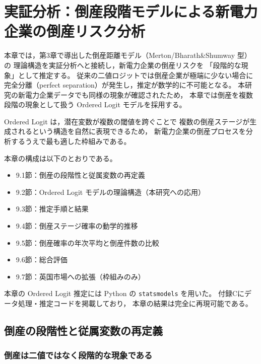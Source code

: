 
\chapter{実証分析：倒産段階モデルによる新電力企業の倒産リスク分析}
\label{chap:empirical}

本章では，第3章で導出した倒産距離モデル（Merton/Bharath\&Shumway 型）の
理論構造を実証分析へと接続し，新電力企業の倒産リスクを
「段階的な現象」として推定する。
従来の二値ロジットでは倒産企業が極端に少ない場合に
完全分離（perfect separation）が発生し，推定が数学的に不可能となる。
本研究の新電力企業データでも同様の現象が確認されたため，
本章では倒産を複数段階の現象として扱う Ordered Logit モデルを採用する。

Ordered Logit は，潜在変数が複数の閾値を跨ぐことで
複数の倒産ステージが生成されるという構造を自然に表現できるため，
新電力企業の倒産プロセスを分析するうえで最も適した枠組みである。

本章の構成は以下のとおりである。

\begin{itemize}
    \item 9.1節：倒産の段階性と従属変数の再定義
    \item 9.2節：Ordered Logit モデルの理論構造（本研究への応用）
    \item 9.3節：推定手順と結果
    \item 9.4節：倒産ステージ確率の動学的推移
    \item 9.5節：倒産確率の年次平均と倒産件数の比較
    \item 9.6節：総合評価
    \item 9.7節：英国市場への拡張（枠組みのみ）
\end{itemize}

本章の Ordered Logit 推定には Python の \texttt{statsmodels} を用いた。
付録Cにデータ処理・推定コードを掲載しており，
本章の結果は完全に再現可能である。

\section{倒産の段階性と従属変数の再定義}
\label{sec:stage_definition}

\subsection{倒産は二値ではなく段階的な現象である}

